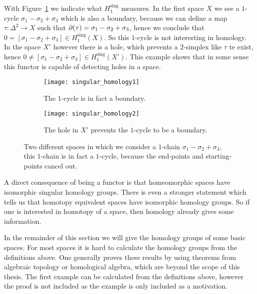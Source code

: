 With Figure~\ref{fig:singular_homology} we indicate what $H^\text{sing}_1$ measures. In the first space $X$ we see a $1$-cycle $\sigma_1-\sigma_2+\sigma_3$ which is also a boundary, because we can define a map $\tau: \Delta^2 \to X$ such that $\partial(\tau) = \sigma_1-\sigma_2+\sigma_3$, hence we conclude that $0 = [\sigma_1-\sigma_2+\sigma_3] \in H^\text{sing}_1(X)$. So this $1$-cycle is not interesting in homology. In the space $X'$ however there is a hole, which prevents a $2$-simplex like $\tau$ te exist, hence $0 \neq [\sigma_1-\sigma_2+\sigma_3] \in H^\text{sing}_1(X')$. This example shows that in some sense this functor is capable of detecting holes in a space.

\begin{figure}[H]
\begin{subfigure}{.5\textwidth}
  \centering
  \texttt{[image: singular\_homology1]}
  \caption{The $1$-cycle is in fact a boundary.}
\end{subfigure}%
\begin{subfigure}{.5\textwidth}
  \centering
  \texttt{[image: singular\_homology2]}
  \caption{The hole in $X'$ prevents the $1$-cycle to be a boundary.}
\end{subfigure}
\caption{Two different spaces in which we consider a $1$-chain $\sigma_1-\sigma_2+\sigma_3$, this $1$-chain is in fact a $1$-cycle, because the end-points and starting-points cancel out.}
\label{fig:singular_homology}
\end{figure}

A direct consequence of being a functor is that homeomorphic spaces have isomorphic singular homology groups. There is even a stronger statement which tells us that homotopy equivalent spaces have isomorphic homology groups. So if one is interested in homotopy of a space, then homology already gives some information.

In the remainder of this section we will give the homology groups of some basic spaces. For most spaces it is hard to calculate the homology groups from the definitions above. One generally proves these results by using theorems from algebraic topology or homological algebra, which are beyond the scope of this thesis. The first example can be calculated from the definitions above, however the proof is not included as the example is only included as a motivation.

